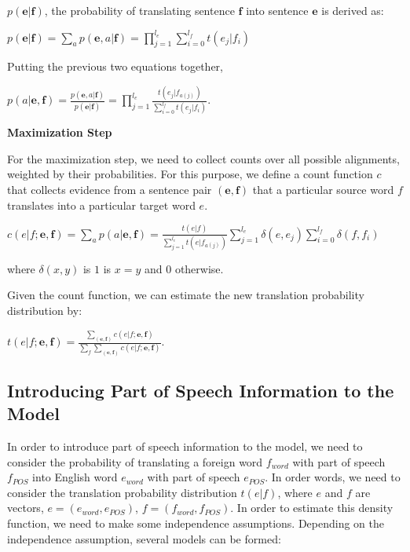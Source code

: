 \documentclass[10pt]{report}
\theoremstyle{plain}
\begin{document}
{$p(\textbf{e}|\textbf{f})$, the probability of translating sentence
$\textbf{f}$ into sentence $\textbf{e}$ is derived as:

\begin{center}

$p(\textbf{e}|\textbf{f}) = \sum_a p(\textbf{e},a|\textbf{f}) =
\prod_{j=1}^{l_e} \sum_{i=0}^{l_f}t(e_j|f_i)$
\end{center}

Putting the previous two equations together,

\begin{center}

 $p(a|\textbf{e},\textbf{f}) =
\frac{p(\textbf{e},a|\textbf{f})}{p(\textbf{e}|\textbf{f})}
=\prod_{j=1}^{l_e} \frac {t(e_j | f_{a(j)})}{\sum_{i=0}^{l_f}
t(e_j|f_i)}$.


\end{center}

\textbf{Maximization Step}

For the maximization step, we need to collect counts over all
possible alignments, weighted by their probabilities. For this
purpose, we define a count function $c$ that collects evidence from
a sentence pair $(\textbf{e},\textbf{f})$ that a particular source
word $f$  translates into a particular target word $e$.

\begin{center}

$c(e|f;\textbf{e},\textbf{f}) = \sum_a p(a|\textbf{e},\textbf{f}) =
\frac{t(e|f)}{\sum_{j=1}^{l_e}t(e|f_{a(j)})} \sum_{j=1}^{l_e}
\delta(e,e_j)\sum_{i=0}^{l_f}\delta(f,f_i)$

\end{center}

where $\delta(x,y)$ is $1$ is $x=y$ and $0$ otherwise.

Given the count function, we can estimate the new translation
probability distribution by:

\begin{center}
$t(e|f;\textbf{e},\textbf{f}) =
\frac{\sum_{(\textbf{e},\textbf{f})}c(e|f;\textbf{e},\textbf{f})}{\sum_f\sum_{(\textbf{e},\textbf{f})}c(e|f;\textbf{e},\textbf{f})}$.
\end{center}


\subsection{Introducing Part of Speech Information to the Model}
In order to introduce part of speech information to the model, we
need to consider the probability of translating a foreign word
$f_{word}$ with part of speech $f_{POS}$ into English word
$e_{word}$ with part of speech $e_{POS}$. In order words, we need to
consider the translation probability distribution $t(e|f)$, where
$e$ and $f$ are vectors, $e = (e_{word},e_{POS})$, $f = (f_{word},
f_{POS})$. In order to estimate this density function, we need to
make some independence assumptions. Depending on the independence
assumption, several models can be formed:

}
\end{document}
